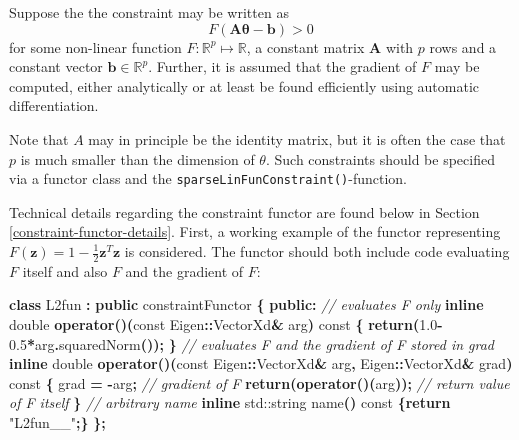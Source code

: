 \documentclass[
]{book}
\newenvironment{Shaded}{\begin{snugshade}}{\end{snugshade}}
\newcommand{\AttributeTok}[1]{\textcolor[rgb]{0.77,0.63,0.00}{#1}}
\newcommand{\BuiltInTok}[1]{#1}
\newcommand{\CommentTok}[1]{\textcolor[rgb]{0.56,0.35,0.01}{\textit{#1}}}
\newcommand{\ControlFlowTok}[1]{\textcolor[rgb]{0.13,0.29,0.53}{\textbf{#1}}}
\newcommand{\DataTypeTok}[1]{\textcolor[rgb]{0.13,0.29,0.53}{#1}}
\newcommand{\FloatTok}[1]{\textcolor[rgb]{0.00,0.00,0.81}{#1}}
\newcommand{\KeywordTok}[1]{\textcolor[rgb]{0.13,0.29,0.53}{\textbf{#1}}}
\newcommand{\NormalTok}[1]{#1}
\newcommand{\OperatorTok}[1]{\textcolor[rgb]{0.81,0.36,0.00}{\textbf{#1}}}
\newcommand{\StringTok}[1]{\textcolor[rgb]{0.31,0.60,0.02}{#1}}
\begin{document}
Suppose the the constraint may be written as
\[
F(\mathbf A \boldsymbol \theta - \mathbf b)>0
\]
for some non-linear function \(F:\mathbb R^p \mapsto \mathbb R\), a constant matrix \(\mathbf A\) with \(p\) rows and a constant vector \(\mathbf b \in \mathbb R^p\). Further, it is assumed that the gradient of \(F\) may be computed, either analytically or at least be found efficiently using automatic differentiation.

Note that \(A\) may in principle be the identity matrix, but it is often the case that \(p\) is much smaller than the dimension of \(\theta\). Such constraints should be specified via a functor class and the \texttt{sparseLinFunConstraint()}-function.

Technical details regarding the constraint functor are found below in Section \ref{constraint-functor-details}. First, a working example of the functor representing \(F(\mathbf z)=1-\frac{1}{2}\mathbf z^T \mathbf z\) is considered. The functor should both include code evaluating \(F\) itself and also \(F\) and the gradient of \(F\):

\begin{Shaded}
\begin{Highlighting}[]
\KeywordTok{class}\NormalTok{ L2fun }\OperatorTok{:} \KeywordTok{public}\NormalTok{ constraintFunctor }\OperatorTok{\{}
\KeywordTok{public}\OperatorTok{:}
  \CommentTok{// evaluates F only}
  \KeywordTok{inline} \DataTypeTok{double} \KeywordTok{operator}\OperatorTok{()(}\AttributeTok{const}\NormalTok{ Eigen}\OperatorTok{::}\NormalTok{VectorXd}\OperatorTok{\&}\NormalTok{ arg}\OperatorTok{)} \AttributeTok{const} \OperatorTok{\{}
    \ControlFlowTok{return}\OperatorTok{(}\FloatTok{1.0}\OperatorTok{{-}}\FloatTok{0.5}\OperatorTok{*}\NormalTok{arg}\OperatorTok{.}\NormalTok{squaredNorm}\OperatorTok{());} 
  \OperatorTok{\}}
  \CommentTok{// evaluates F and the gradient of F stored in grad}
  \KeywordTok{inline} \DataTypeTok{double} \KeywordTok{operator}\OperatorTok{()(}\AttributeTok{const}\NormalTok{ Eigen}\OperatorTok{::}\NormalTok{VectorXd}\OperatorTok{\&}\NormalTok{ arg}\OperatorTok{,}
\NormalTok{                         Eigen}\OperatorTok{::}\NormalTok{VectorXd}\OperatorTok{\&}\NormalTok{ grad}\OperatorTok{)} \AttributeTok{const} \OperatorTok{\{}
\NormalTok{    grad }\OperatorTok{=} \OperatorTok{{-}}\NormalTok{arg}\OperatorTok{;} \CommentTok{// gradient of F}
    \ControlFlowTok{return}\OperatorTok{(}\KeywordTok{operator}\OperatorTok{()(}\NormalTok{arg}\OperatorTok{));} \CommentTok{// return value of F itself}
  \OperatorTok{\}}
  \CommentTok{// arbitrary name}
  \KeywordTok{inline} \BuiltInTok{std::}\NormalTok{string}\OperatorTok{ }\NormalTok{name}\OperatorTok{()} \AttributeTok{const} \OperatorTok{\{}\ControlFlowTok{return} \StringTok{"L2fun\_\_"}\OperatorTok{;\}}
\OperatorTok{\};}
\end{Highlighting}
\end{Shaded}
\end{document}
